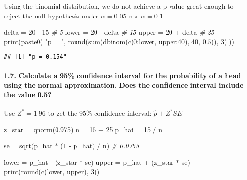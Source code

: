 \documentclass[
]{article}
\newenvironment{Shaded}{\begin{snugshade}}{\end{snugshade}}
\newcommand{\CommentTok}[1]{\textcolor[rgb]{0.56,0.35,0.01}{\textit{#1}}}
\newcommand{\DecValTok}[1]{\textcolor[rgb]{0.00,0.00,0.81}{#1}}
\newcommand{\FloatTok}[1]{\textcolor[rgb]{0.00,0.00,0.81}{#1}}
\newcommand{\FunctionTok}[1]{\textcolor[rgb]{0.00,0.00,0.00}{#1}}
\newcommand{\NormalTok}[1]{#1}
\newcommand{\OtherTok}[1]{\textcolor[rgb]{0.56,0.35,0.01}{#1}}
\newcommand{\SpecialCharTok}[1]{\textcolor[rgb]{0.00,0.00,0.00}{#1}}
\newcommand{\StringTok}[1]{\textcolor[rgb]{0.31,0.60,0.02}{#1}}
\begin{document}
Using the binomial distribution, we do not achieve a p-value great
enough to reject the null hypothesis under \(\alpha = 0.05\) nor
\(\alpha = 0.1\)

\begin{Shaded}
\begin{Highlighting}[]
\NormalTok{delta }\OtherTok{=} \DecValTok{20} \SpecialCharTok{{-}} \DecValTok{15} \CommentTok{\# 5}
\NormalTok{lower }\OtherTok{=} \DecValTok{20} \SpecialCharTok{{-}}\NormalTok{ delta }\CommentTok{\# 15}
\NormalTok{upper }\OtherTok{=} \DecValTok{20} \SpecialCharTok{+}\NormalTok{ delta }\CommentTok{\# 25}
\FunctionTok{print}\NormalTok{(}\FunctionTok{paste0}\NormalTok{(}
  \StringTok{"p = "}\NormalTok{,}
  \FunctionTok{round}\NormalTok{(}\FunctionTok{sum}\NormalTok{(}\FunctionTok{dbinom}\NormalTok{(}\FunctionTok{c}\NormalTok{(}\DecValTok{0}\SpecialCharTok{:}\NormalTok{lower, upper}\SpecialCharTok{:}\DecValTok{40}\NormalTok{), }\DecValTok{40}\NormalTok{, }\FloatTok{0.5}\NormalTok{)), }\DecValTok{3}\NormalTok{)}
\NormalTok{))}
\end{Highlighting}
\end{Shaded}

\begin{verbatim}
## [1] "p = 0.154"
\end{verbatim}

\hypertarget{calculate-a-95-confidence-interval-for-the-probability-of-a-head-using-the-normal-approximation.-does-the-confidence-interval-include-the-value-0.5}{%
\paragraph{1.7. Calculate a 95\% confidence interval for the probability
of a head using the normal approximation. Does the confidence interval
include the value
0.5?}\label{calculate-a-95-confidence-interval-for-the-probability-of-a-head-using-the-normal-approximation.-does-the-confidence-interval-include-the-value-0.5}}

Use \(Z^*=1.96\) to get the 95\% confidence interval:
\(\hat{p} \pm Z^* SE\)

\begin{Shaded}
\begin{Highlighting}[]
\NormalTok{z\_star }\OtherTok{=} \FunctionTok{qnorm}\NormalTok{(}\FloatTok{0.975}\NormalTok{)}
\NormalTok{n }\OtherTok{=} \DecValTok{15} \SpecialCharTok{+} \DecValTok{25}
\NormalTok{p\_hat }\OtherTok{=} \DecValTok{15} \SpecialCharTok{/}\NormalTok{ n}

\NormalTok{se }\OtherTok{=} \FunctionTok{sqrt}\NormalTok{(p\_hat }\SpecialCharTok{*}\NormalTok{ (}\DecValTok{1} \SpecialCharTok{{-}}\NormalTok{ p\_hat) }\SpecialCharTok{/}\NormalTok{ n) }\CommentTok{\# 0.0765}

\NormalTok{lower }\OtherTok{=}\NormalTok{ p\_hat }\SpecialCharTok{{-}}\NormalTok{ (z\_star }\SpecialCharTok{*}\NormalTok{ se)}
\NormalTok{upper }\OtherTok{=}\NormalTok{ p\_hat }\SpecialCharTok{+}\NormalTok{ (z\_star }\SpecialCharTok{*}\NormalTok{ se)}
\FunctionTok{print}\NormalTok{(}\FunctionTok{round}\NormalTok{(}\FunctionTok{c}\NormalTok{(lower, upper), }\DecValTok{3}\NormalTok{))}
\end{Highlighting}
\end{Shaded}
\end{document}
